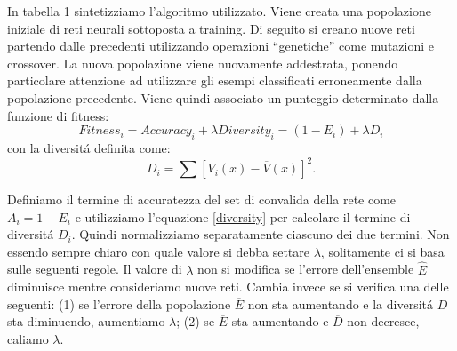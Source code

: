 \documentclass[a4paper,10pt]{article}
\begin{document}
  
  In tabella 1 sintetizziamo l'algoritmo utilizzato. Viene creata una popolazione iniziale di reti neurali sottoposta a training. Di seguito si creano nuove reti partendo dalle precedenti utilizzando operazioni ``genetiche'' come mutazioni e crossover. La nuova popolazione viene nuovamente addestrata, ponendo particolare attenzione ad utilizzare gli esempi classificati erroneamente dalla popolazione precedente. Viene quindi associato un punteggio determinato dalla funzione di fitness:
  \begin{equation}
   Fitness_i = Accuracy_i + \lambda Diversity_i = (1-E_i) + \lambda D_i \label{fitness}
  \end{equation}
  con la diversit\'a definita come:
  \begin{equation}
   D_i = \sum \left[ V_i \left(x\right) - \overline{V} \left(x\right) \right]^2. \label{diversity}
  \end{equation}
  
  Definiamo il termine di accuratezza del set di convalida della rete come $A_i = 1-E_i$ e utilizziamo l'equazione \ref{diversity} per calcolare il termine di diversit\'a $D_i$. Quindi normalizziamo separatamente ciascuno dei due termini. Non essendo sempre chiaro con quale valore si debba settare $\lambda$, solitamente ci si basa sulle seguenti regole. Il valore di $\lambda$ non si modifica se l'errore dell'ensemble $\hat{E}$ diminuisce mentre consideriamo nuove reti. Cambia invece se si verifica una delle seguenti: (1) se l'errore della popolazione $\overline{E}$ non sta aumentando e la diversit\'a $D$ sta diminuendo, aumentiamo $\lambda$; (2) se $\overline{E}$ sta aumentando e $\overline{D}$ non decresce, caliamo $\lambda$.
  
\end{document}
